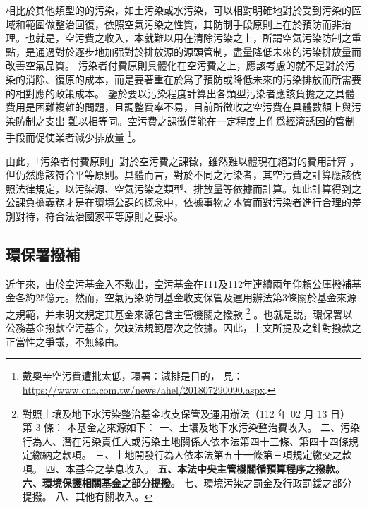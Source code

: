 \documentclass[12pt,a4paper]{article}
\begin{document}
相比於其他類型的的污染，如土污染或水污染，可以相對明確地對於受到污染的區域和範圍做整治回復，依照空氣污染之性質，其防制手段原則上在於預防而非治理。也就是，空污費之收入，本就難以用在清除污染之上，所謂空氣污染防制之重點，是通過對於逐步地加强對於排放源的源頭管制，盡量降低未來的污染排放量而改善空氣品質。
污染者付費原則具體化在空污費之上，應該考慮的就不是對於污染的消除、復原的成本，而是要著重在於爲了預防或降低未來的污染排放而所需要的相對應的政策成本。
鑒於要以污染程度計算出各類型污染者應該負擔之之具體費用是困難複雜的問題，且調整費率不易，目前所徵收之空污費在具體數額上與污染防制之支出
難以相等同。空污費之課徵僅能在一定程度上作爲經濟誘因的管制手段而促使業者減少排放量
\footnote{戴奧辛空污費遭批太低，環署：減排是目的，
見：\url{https://www.cna.com.tw/news/ahel/201807290090.aspx}.}。

由此，「污染者付費原則」對於空污費之課徵，雖然難以體現在絕對的費用計算
，但仍然應該符合平等原則。具體而言，對於不同之污染者，其空污費之計算應該依照法律規定，以污染源、空氣污染之類型、排放量等依據而計算。如此計算得到之公課負擔義務才是在環境公課的概念中，依據事物之本質而對污染者進行合理的差別對待，符合法治國家平等原則之要求。


\subsection{環保署撥補}

近年來，由於空污基金入不敷出，空污基金在111及112年連續兩年仰賴公庫撥補基金各約25億元。然而，空氣污染防制基金收支保管及運用辦法第3條關於基金來源之規範，并未明文規定其基金來源包含主管機關之撥款
\footnote{
對照土壤及地下水污染整治基金收支保管及運用辦法（112 年 02 月 13 日）
第 3 條：
本基金之來源如下：
一、土壤及地下水污染整治費收入。
二、污染行為人、潛在污染責任人或污染土地關係人依本法第四十三條、第四十四條規定繳納之款項。
三、土地開發行為人依本法第五十一條第三項規定繳交之款項。
四、本基金之孳息收入。
\textbf{五、本法中央主管機關循預算程序之撥款。
六、環境保護相關基金之部分提撥。}
七、環境污染之罰金及行政罰鍰之部分提撥。
八、其他有關收入。}
。也就是説，環保署以公務基金撥款空污基金，欠缺法規範層次之依據。因此，上文所提及之針對撥款之正當性之爭議，不無緣由。
\end{document}
